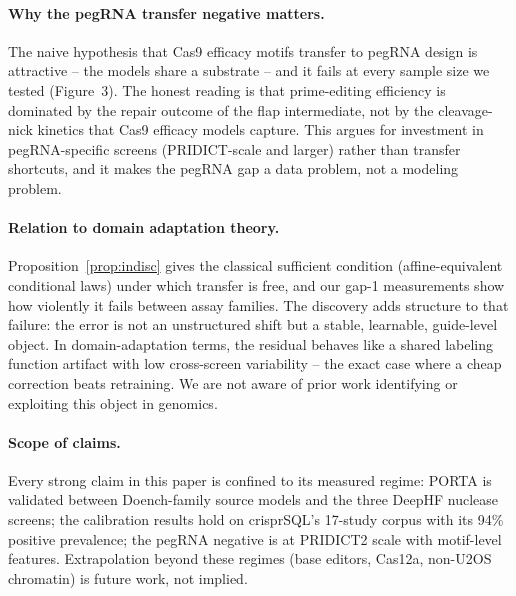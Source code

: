 \paragraph{Why the pegRNA transfer negative matters.}
The naive hypothesis that Cas9 efficacy motifs transfer to pegRNA design
is attractive -- the models share a substrate -- and it fails at every
sample size we tested (Figure~3). The honest reading is that prime-editing
efficiency is dominated by the repair outcome of the flap intermediate,
not by the cleavage-nick kinetics that Cas9 efficacy models capture. This
argues for investment in pegRNA-specific screens (PRIDICT-scale and
larger) rather than transfer shortcuts, and it makes the pegRNA gap a
data problem, not a modeling problem.

\paragraph{Relation to domain adaptation theory.}
Proposition~\ref{prop:indisc} gives the classical sufficient condition
(affine-equivalent conditional laws) under which transfer is free, and
our gap-1 measurements show how violently it fails between assay
families. The discovery adds structure to that failure: the error is not
an unstructured shift but a stable, learnable, guide-level object. In
domain-adaptation terms, the residual behaves like a shared labeling
function artifact with low cross-screen variability -- the exact case
where a cheap correction beats retraining. We are not aware of prior work
identifying or exploiting this object in genomics.

\paragraph{Scope of claims.}
Every strong claim in this paper is confined to its measured regime:
PORTA is validated between Doench-family source models and the three
DeepHF nuclease screens; the calibration results hold on crisprSQL's
17-study corpus with its 94\% positive prevalence; the pegRNA negative is
at PRIDICT2 scale with motif-level features. Extrapolation beyond these
regimes (base editors, Cas12a, non-U2OS chromatin) is future work, not
implied.

